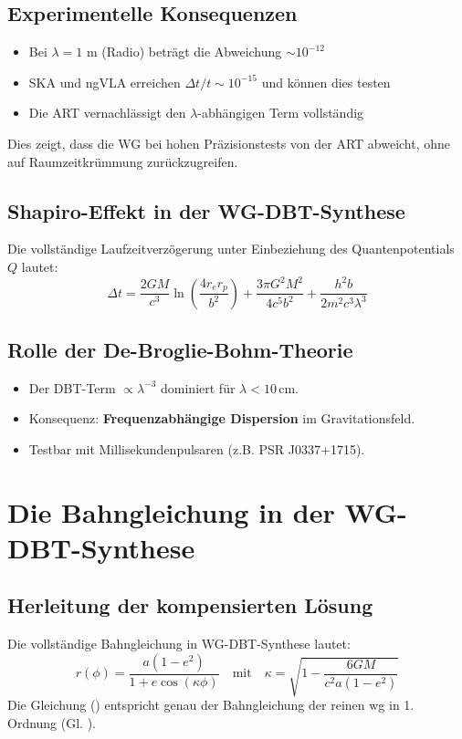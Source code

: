\subsection{Experimentelle Konsequenzen}
\begin{itemize}
\item Bei $\lambda = 1$ m (Radio) beträgt die Abweichung $\sim 10^{-12}$
\item SKA und ngVLA erreichen $\Delta t/t \sim 10^{-15}$ und können dies testen
\item Die ART vernachlässigt den $\lambda$-abhängigen Term vollständig
\end{itemize}

Dies zeigt, dass die WG bei hohen Präzisionstests von der ART abweicht, ohne auf Raumzeitkrümmung zurückzugreifen.

\subsection{Shapiro-Effekt in der WG-DBT-Synthese}  
\label{sec:shapiro_dbt}  

Die vollständige Laufzeitverzögerung unter Einbeziehung des Quantenpotentials $Q$ lautet:  
\begin{equation}
    \boxed
    {
        \Delta t = \frac{2GM}{c^3} \ln\left(\frac{4r_e r_p}{b^2}\right) + \frac{3\pi G^2 M^2}{4c^5 b^2} + \frac{h^2 b}{2m^2 c^3 \lambda^3}  
    }
\end{equation}
\subsection*{Rolle der De-Broglie-Bohm-Theorie}  
\begin{itemize}  
\item Der DBT-Term $\propto \lambda^{-3}$ dominiert für $\lambda < 10\,$cm.  
\item Konsequenz: \textbf{Frequenzabhängige Dispersion} im Gravitationsfeld.  
\item Testbar mit Millisekundenpulsaren (z.B. PSR J0337+1715).  
\end{itemize}  

\newpage
\section{Die Bahngleichung in der WG-DBT-Synthese}
\label{sec:bahn_alpha}

\subsection{Herleitung der kompensierten Lösung}
Die vollständige Bahngleichung in WG-DBT-Synthese lautet:
\begin{equation}
    \label{eq:r_wg_dbt}
    r(\phi) = \frac{a(1-e^2)}{1 + e\cos(\kappa\phi)} \quad \text{mit} \quad \kappa = \sqrt{1 - \frac{6GM}{c^2a(1-e^2)}}
\end{equation}
Die Gleichung () entspricht genau der Bahngleichung der reinen \gls{wg} in 1. Ordnung (Gl. ).

